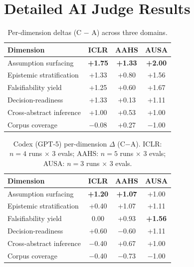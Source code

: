 \documentclass{article}
\begin{document}
\section{Detailed AI Judge Results}
\label{app:scores}

\begin{table}[h]
\caption{Per-dimension deltas (C $-$ A) across three domains.}
\label{tab:dimensions}
\begin{center}
\begin{tabular}{lccc}
\toprule
\textbf{Dimension} & \textbf{ICLR} & \textbf{AAHS} & \textbf{AUSA} \\
\midrule
Assumption surfacing & \textbf{+1.75} & \textbf{+1.33} & \textbf{+2.00} \\
Epistemic stratification & +1.33 & +0.80 & +1.56 \\
Falsifiability yield & +1.25 & +0.60 & +1.67 \\
Decision-readiness & +1.33 & +0.13 & +1.11 \\
Cross-abstract inference & +1.00 & +0.53 & +1.00 \\
Corpus coverage & $-$0.08 & +0.27 & $-$1.00 \\
\bottomrule
\end{tabular}
\end{center}
\end{table}

\begin{table}[h]
\caption{Codex (GPT-5) per-dimension $\Delta$ (C$-$A). ICLR: $n{=}4$ runs $\times$ 3 evals; AAHS: $n{=}5$ runs $\times$ 3 evals; AUSA: $n{=}3$ runs $\times$ 3 evals.}
\label{tab:dimensions_codex}
\begin{center}
\begin{tabular}{lccc}
\toprule
\textbf{Dimension} & \textbf{ICLR} & \textbf{AAHS} & \textbf{AUSA} \\
\midrule
Assumption surfacing & \textbf{+1.20} & \textbf{+1.07} & +1.00 \\
Epistemic stratification & +0.40 & +1.07 & +1.11 \\
Falsifiability yield & 0.00 & +0.93 & \textbf{+1.56} \\
Decision-readiness & +0.60 & $-$0.60 & +1.11 \\
Cross-abstract inference & $-$0.40 & +0.67 & +1.00 \\
Corpus coverage & $-$0.40 & $-$0.73 & $-$1.00 \\
\bottomrule
\end{tabular}
\end{center}
\end{table}
\end{document}
